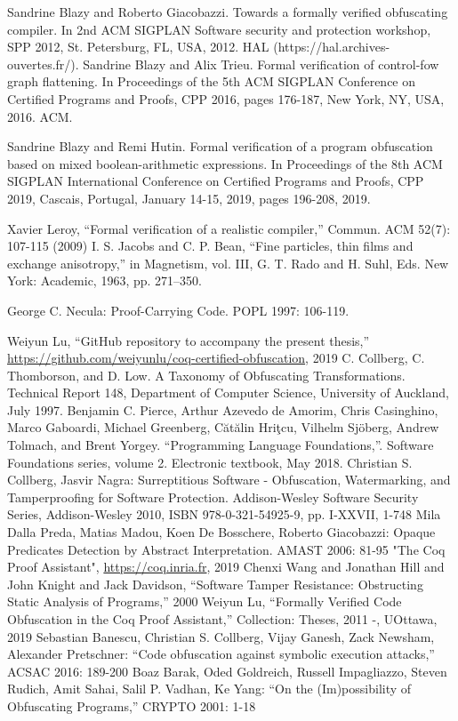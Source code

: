 \documentclass[compsoc,conference,a4paper,10pt,times]{IEEEtran}
\begin{document}
\begin{thebibliography}{00}
 Sandrine Blazy and Roberto Giacobazzi. Towards a formally verified obfuscating compiler. In 2nd ACM SIGPLAN Software security and protection
workshop, SPP 2012, St. Petersburg, FL, USA, 2012. HAL (https://hal.archives-ouvertes.fr/).
 Sandrine Blazy and Alix Trieu. Formal verification of control-fow graph flattening. In Proceedings of the 5th ACM SIGPLAN Conference on Certified
Programs and Proofs, CPP 2016, pages 176-187, New York, NY, USA, 2016. ACM.

 Sandrine Blazy and Remi Hutin. Formal verification of a program obfuscation based on mixed boolean-arithmetic expressions. In Proceedings of the 8th ACM SIGPLAN International Conference on Certified Programs and Proofs, CPP 2019, Cascais, Portugal, January 14-15, 2019, pages 196-208, 2019.

 	Xavier Leroy, ``Formal verification of a realistic compiler,'' Commun. ACM 52(7): 107-115 (2009)
 I. S. Jacobs and C. P. Bean, ``Fine particles, thin films and exchange anisotropy,'' in Magnetism, vol. III, G. T. Rado and H. Suhl, Eds. New York: Academic, 1963, pp. 271--350.

 George C. Necula: Proof-Carrying Code. POPL 1997: 106-119. 

 Weiyun Lu, ``GitHub repository to accompany the present thesis,'' \url{https://github.com/weiyunlu/coq-certified-obfuscation}, 2019 
 C. Collberg, C. Thomborson, and D. Low.
A Taxonomy of Obfuscating Transformations.
Technical Report 148, Department of Computer Science, University of Auckland, July 1997.
 Benjamin C. Pierce, Arthur Azevedo de Amorim, Chris Casinghino, Marco Gaboardi, Michael Greenberg, C\u{a}t\u{a}lin Hri\c{t}cu, Vilhelm Sj\"oberg, Andrew 
Tolmach, and Brent Yorgey. ``Programming Language Foundations,''. Software Foundations series, volume 2. Electronic textbook, May 2018.
 	Christian S. Collberg, Jasvir Nagra:
Surreptitious Software - Obfuscation, Watermarking, and Tamperproofing for Software Protection. Addison-Wesley Software Security Series, Addison-Wesley 2010, ISBN 978-0-321-54925-9, pp. I-XXVII, 1-748
 Mila Dalla Preda, Matias Madou, Koen De Bosschere, Roberto Giacobazzi:
Opaque Predicates Detection by Abstract Interpretation. AMAST 2006: 81-95
 "The {Coq Proof Assistant}", \url{https://coq.inria.fr}, 2019
 Chenxi Wang and Jonathan Hill and John Knight and Jack Davidson, ``Software Tamper Resistance: Obstructing Static Analysis of Programs,'' 2000
 Weiyun Lu, ``Formally Verified Code Obfuscation in the Coq Proof Assistant,'' Collection: Theses, 2011 -, UOttawa, 2019 
 	Sebastian Banescu, Christian S. Collberg, Vijay Ganesh, Zack Newsham, Alexander Pretschner:
``Code obfuscation against symbolic execution attacks,'' ACSAC 2016: 189-200
 Boaz Barak, Oded Goldreich, Russell Impagliazzo, Steven Rudich, Amit Sahai, Salil P. Vadhan, Ke Yang:
``On the (Im)possibility of Obfuscating Programs,'' CRYPTO 2001: 1-18
\end{thebibliography}
\end{document}
